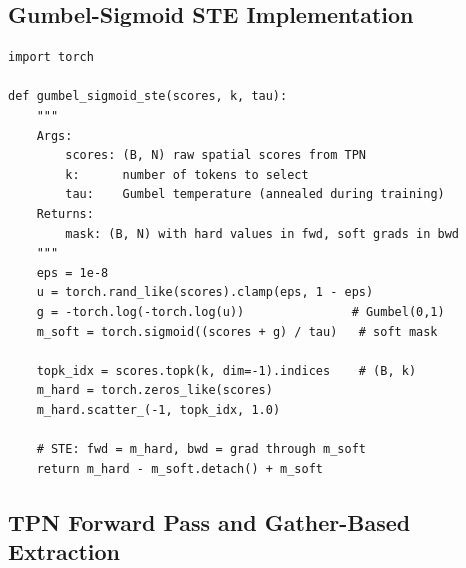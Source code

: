 \documentclass[11pt,a4paper]{article}
\begin{document}
\subsection{Gumbel-Sigmoid STE Implementation}

\begin{lstlisting}[caption={Gumbel-Sigmoid STE for top-$k$ selection
  (PyTorch).}]
import torch

def gumbel_sigmoid_ste(scores, k, tau):
    """
    Args:
        scores: (B, N) raw spatial scores from TPN
        k:      number of tokens to select
        tau:    Gumbel temperature (annealed during training)
    Returns:
        mask: (B, N) with hard values in fwd, soft grads in bwd
    """
    eps = 1e-8
    u = torch.rand_like(scores).clamp(eps, 1 - eps)
    g = -torch.log(-torch.log(u))               # Gumbel(0,1)
    m_soft = torch.sigmoid((scores + g) / tau)   # soft mask

    topk_idx = scores.topk(k, dim=-1).indices    # (B, k)
    m_hard = torch.zeros_like(scores)
    m_hard.scatter_(-1, topk_idx, 1.0)

    # STE: fwd = m_hard, bwd = grad through m_soft
    return m_hard - m_soft.detach() + m_soft
\end{lstlisting}

\subsection{TPN Forward Pass and Gather-Based Extraction}
\end{document}
